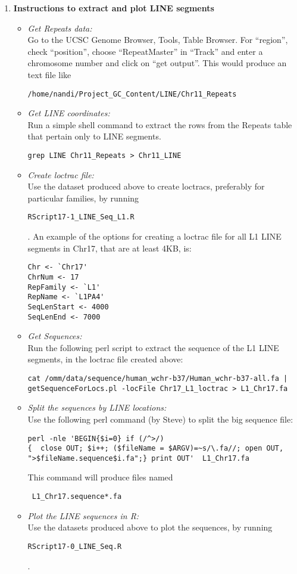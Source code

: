\documentclass[11pt]{article}
\begin{document}
\begin{enumerate}
\item
{\bf{Instructions to extract and plot LINE segments}}
\begin{itemize}
\item 
\emph{Get Repeats data:} \\ 
Go to the UCSC Genome Browser, Tools, Table Browser. For ``region'', check ``position'', choose ``RepeatMaster'' in ``Track'' and enter a chromosome number and click on ``get output''. This would produce an text file like 
\begin{verbatim}
/home/nandi/Project_GC_Content/LINE/Chr11_Repeats
\end{verbatim}
\item
\emph{Get LINE coordinates:} \\ 
Run a simple shell command to extract the rows from the Repeats table that pertain only to LINE segments.
\begin{verbatim}
grep LINE Chr11_Repeats > Chr11_LINE
\end{verbatim}
\item
\emph{Create loctrac file:} \\ 
Use the dataset produced above to create loctracs, preferably for particular families, by running 
\begin{verbatim} 
RScript17-1_LINE_Seq_L1.R 
\end{verbatim}. 
An example of the options for creating a loctrac file for all L1 LINE segments in Chr17, that are at least 4KB, is:
\begin{verbatim}
Chr <- `Chr17'
ChrNum <- 17
RepFamily <- `L1'
RepName <- `L1PA4'
SeqLenStart <- 4000
SeqLenEnd <- 7000
\end{verbatim}
\item
\emph{Get Sequences:} \\ 
Run the following perl script to extract the sequence of the L1 LINE segments, in the loctrac file created above:
\begin{verbatim}
cat /omm/data/sequence/human_wchr-b37/Human_wchr-b37-all.fa | 
getSequenceForLocs.pl -locFile Chr17_L1_loctrac > L1_Chr17.fa
\end{verbatim}
\item
\emph{Split the sequences by LINE locations:} \\
Use the following perl command (by Steve) to split the big sequence file: 
\begin{verbatim}
perl -nle 'BEGIN{$i=0} if (/^>/) 
{  close OUT; $i++; ($fileName = $ARGV)=~s/\.fa//; open OUT, 
">$fileName.sequence$i.fa";} print OUT'  L1_Chr17.fa
\end{verbatim}
This command will produce files named \begin{verbatim} L1_Chr17.sequence*.fa \end{verbatim}
\item
\emph{Plot the LINE sequences in R:} \\
Use the datasets produced above to plot the sequences, by running 
\begin{verbatim} 
RScript17-0_LINE_Seq.R 
\end{verbatim}. 
\end{itemize}


\end{enumerate}
\end{document}
